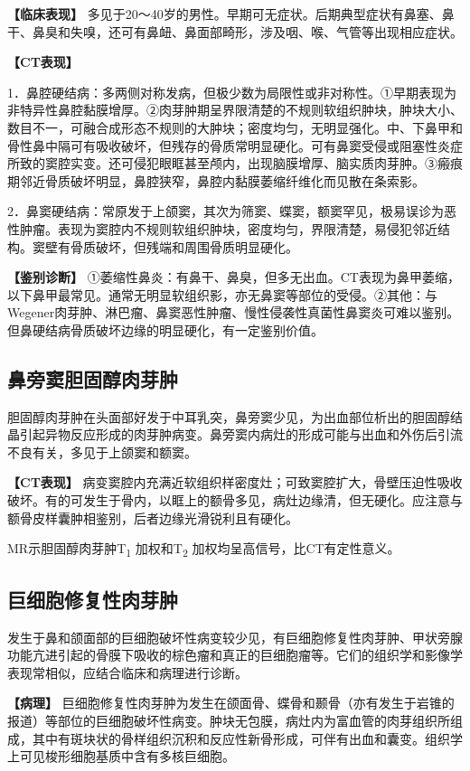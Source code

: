 \textbf{【临床表现】}
多见于20～40岁的男性。早期可无症状。后期典型症状有鼻塞、鼻干、鼻臭和失嗅，还可有鼻衄、鼻面部畸形，涉及咽、喉、气管等出现相应症状。

\textbf{【CT表现】}

1．鼻腔硬结病：多两侧对称发病，但极少数为局限性或非对称性。①早期表现为非特异性鼻腔黏膜增厚。②肉芽肿期呈界限清楚的不规则软组织肿块，肿块大小、数目不一，可融合成形态不规则的大肿块；密度均匀，无明显强化。中、下鼻甲和骨性鼻中隔可有吸收破坏，但残存的骨质常明显硬化。可有鼻窦受侵或阻塞性炎症所致的窦腔实变。还可侵犯眼眶甚至颅内，出现脑膜增厚、脑实质肉芽肿。③瘢痕期邻近骨质破坏明显，鼻腔狭窄，鼻腔内黏膜萎缩纤维化而见散在条索影。

2．鼻窦硬结病：常原发于上颌窦，其次为筛窦、蝶窦，额窦罕见，极易误诊为恶性肿瘤。表现为窦腔内不规则软组织肿块，密度均匀，界限清楚，易侵犯邻近结构。窦壁有骨质破坏，但残端和周围骨质明显硬化。

\textbf{【鉴别诊断】}
①萎缩性鼻炎：有鼻干、鼻臭，但多无出血。CT表现为鼻甲萎缩，以下鼻甲最常见。通常无明显软组织影，亦无鼻窦等部位的受侵。②其他：与Wegener肉芽肿、淋巴瘤、鼻窦恶性肿瘤、慢性侵袭性真菌性鼻窦炎可难以鉴别。但鼻硬结病骨质破坏边缘的明显硬化，有一定鉴别价值。

\subsection{鼻旁窦胆固醇肉芽肿}

胆固醇肉芽肿在头面部好发于中耳乳突，鼻旁窦少见，为出血部位析出的胆固醇结晶引起异物反应形成的肉芽肿病变。鼻旁窦内病灶的形成可能与出血和外伤后引流不良有关，多见于上颌窦和额窦。

\textbf{【CT表现】}
病变窦腔内充满近软组织样密度灶；可致窦腔扩大，骨壁压迫性吸收破坏。有的可发生于骨内，以眶上的额骨多见，病灶边缘清，但无硬化。应注意与额骨皮样囊肿相鉴别，后者边缘光滑锐利且有硬化。

MR示胆固醇肉芽肿T\textsubscript{1} 加权和T\textsubscript{2}
加权均呈高信号，比CT有定性意义。

\subsection{巨细胞修复性肉芽肿}

发生于鼻和颌面部的巨细胞破坏性病变较少见，有巨细胞修复性肉芽肿、甲状旁腺功能亢进引起的骨膜下吸收的棕色瘤和真正的巨细胞瘤等。它们的组织学和影像学表现常相似，应结合临床和病理进行诊断。

\textbf{【病理】}
巨细胞修复性肉芽肿为发生在颌面骨、蝶骨和颞骨（亦有发生于岩锥的报道）等部位的巨细胞破坏性病变。肿块无包膜，病灶内为富血管的肉芽组织所组成，其中有斑块状的骨样组织沉积和反应性新骨形成，可伴有出血和囊变。组织学上可见梭形细胞基质中含有多核巨细胞。

